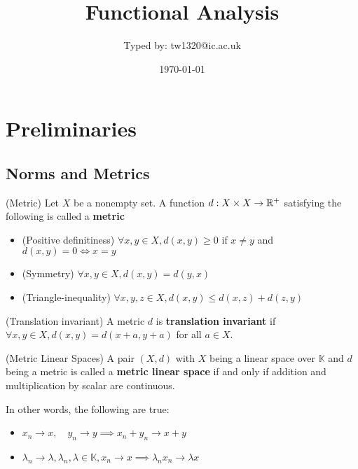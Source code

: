 \documentclass{article}
\title{Functional Analysis}
\author{Typed by: tw1320@ic.ac.uk}
\date{\today}
\begin{document}
\maketitle

\section{Preliminaries}   

\subsection{Norms and Metrics}

\begin{defn}
(Metric) Let $X$ be a nonempty set. 
A function $d: X \times X \to \mathbb{R}^+$ satisfying the following is called a  \textbf{metric}  

\begin{itemize}
    \item (Positive definitiness) $\forall x,y \in X, d(x,y)\geq 0$ if $x \neq y$ and $d(x,y)=0 \iff x=y$
    \item (Symmetry) $\forall x,y \in X, d(x,y)=d(y,x)$
    \item (Triangle-inequality) $\forall x,y,z \in X, d(x,y) \leq d(x,z) + d(z,y)$
\end{itemize}

\end{defn}
\begin{defn}
    (Translation invariant) A metric $d$ is \textbf{translation invariant} if $\forall x,y \in X, d(x,y)=d(x+a,y+a)$ for all $a \in X$.
\end{defn}

\begin{defn}
    (Metric Linear Spaces) 
    A pair $(X, d)$ with $X$ being a linear space over $\mathbb{K}$ and $d$ being a metric is called a \textbf{metric linear space} if and only if
    addition and multiplication by scalar are continuous.
\end{defn}   


In other words, the following are true:  

\begin{itemize}
    \item $x_n \to x, \quad y_n \to y \implies x_n + y_n \to x + y$
    \item $\lambda_n \to \lambda, \lambda_n, \lambda \in \mathbb{K},  x_n \to x \implies \lambda_n x_n \to \lambda x$
\end{itemize}
\end{document}
